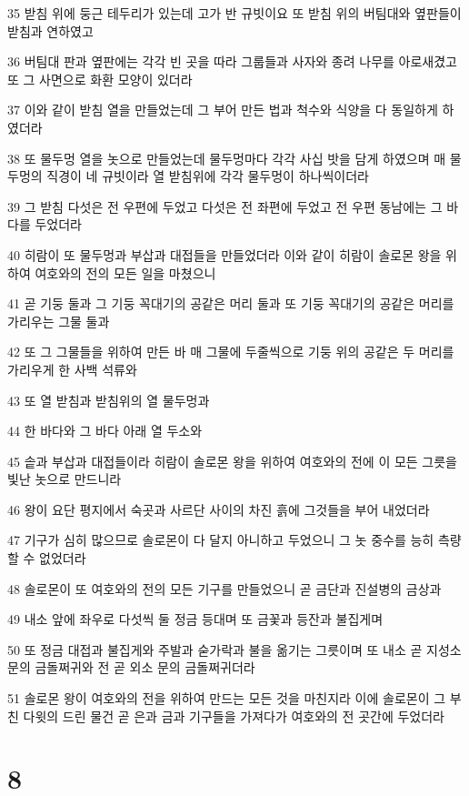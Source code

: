 \par 35 받침 위에 둥근 테두리가 있는데 고가 반 규빗이요 또 받침 위의 버팀대와 옆판들이 받침과 연하였고
\par 36 버팀대 판과 옆판에는 각각 빈 곳을 따라 그룹들과 사자와 종려 나무를 아로새겼고 또 그 사면으로 화환 모양이 있더라
\par 37 이와 같이 받침 열을 만들었는데 그 부어 만든 법과 척수와 식양을 다 동일하게 하였더라
\par 38 또 물두멍 열을 놋으로 만들었는데 물두멍마다 각각 사십 밧을 담게 하였으며 매 물두멍의 직경이 네 규빗이라 열 받침위에 각각 물두멍이 하나씩이더라
\par 39 그 받침 다섯은 전 우편에 두었고 다섯은 전 좌편에 두었고 전 우편 동남에는 그 바다를 두었더라
\par 40 히람이 또 물두멍과 부삽과 대접들을 만들었더라 이와 같이 히람이 솔로몬 왕을 위하여 여호와의 전의 모든 일을 마쳤으니
\par 41 곧 기둥 둘과 그 기둥 꼭대기의 공같은 머리 둘과 또 기둥 꼭대기의 공같은 머리를 가리우는 그물 둘과
\par 42 또 그 그물들을 위하여 만든 바 매 그물에 두줄씩으로 기둥 위의 공같은 두 머리를 가리우게 한 사백 석류와
\par 43 또 열 받침과 받침위의 열 물두멍과
\par 44 한 바다와 그 바다 아래 열 두소와
\par 45 솥과 부삽과 대접들이라 히람이 솔로몬 왕을 위하여 여호와의 전에 이 모든 그릇을 빛난 놋으로 만드니라
\par 46 왕이 요단 평지에서 숙곳과 사르단 사이의 차진 흙에 그것들을 부어 내었더라
\par 47 기구가 심히 많으므로 솔로몬이 다 달지 아니하고 두었으니 그 놋 중수를 능히 측량할 수 없었더라
\par 48 솔로몬이 또 여호와의 전의 모든 기구를 만들었으니 곧 금단과 진설병의 금상과
\par 49 내소 앞에 좌우로 다섯씩 둘 정금 등대며 또 금꽃과 등잔과 불집게며
\par 50 또 정금 대접과 불집게와 주발과 숟가락과 불을 옮기는 그릇이며 또 내소 곧 지성소 문의 금돌쩌귀와 전 곧 외소 문의 금돌쩌귀더라
\par 51 솔로몬 왕이 여호와의 전을 위하여 만드는 모든 것을 마친지라 이에 솔로몬이 그 부친 다윗의 드린 물건 곧 은과 금과 기구들을 가져다가 여호와의 전 곳간에 두었더라

\chapter{8}

